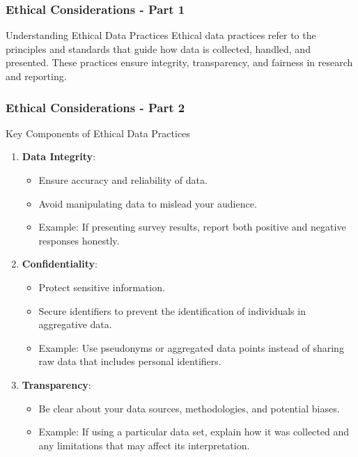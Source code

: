 \documentclass[aspectratio=169]{beamer}
\begin{document}
\begin{frame}[fragile]
    \frametitle{Ethical Considerations - Part 1}
    \begin{block}{Understanding Ethical Data Practices}
        Ethical data practices refer to the principles and standards that guide how data is collected, handled, and presented. These practices ensure integrity, transparency, and fairness in research and reporting.
    \end{block}
\end{frame}

\begin{frame}[fragile]
    \frametitle{Ethical Considerations - Part 2}
    \begin{block}{Key Components of Ethical Data Practices}
        \begin{enumerate}
            \item \textbf{Data Integrity}:
                \begin{itemize}
                    \item Ensure accuracy and reliability of data.
                    \item Avoid manipulating data to mislead your audience.
                    \item Example: If presenting survey results, report both positive and negative responses honestly.
                \end{itemize}
            \item \textbf{Confidentiality}:
                \begin{itemize}
                    \item Protect sensitive information.
                    \item Secure identifiers to prevent the identification of individuals in aggregative data.
                    \item Example: Use pseudonyms or aggregated data points instead of sharing raw data that includes personal identifiers.
                \end{itemize}
            \item \textbf{Transparency}:
                \begin{itemize}
                    \item Be clear about your data sources, methodologies, and potential biases.
                    \item Example: If using a particular data set, explain how it was collected and any limitations that may affect its interpretation.
                \end{itemize}
        \end{enumerate}
    \end{block}
\end{frame}
\end{document}
